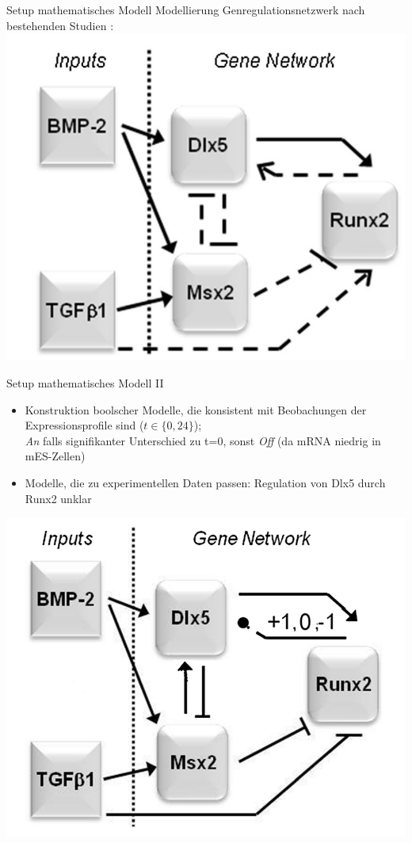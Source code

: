 \documentclass[handout]{beamer}
\begin{document}
\begin{frame}{Setup mathematisches Modell}
Modellierung Genregulationsnetzwerk nach bestehenden Studien
	\pause
	: \includegraphics[scale=0.22]{regulatory_network.jpg}
\end{frame}

\begin{frame}{Setup mathematisches Modell II}
\begin{itemize}
	\item Konstruktion boolscher Modelle, die konsistent mit Beobachungen der Expressionsprofile sind ($t \in \{0,24\}$); 
	\pause
	\\ \emph{An} falls signifikanter Unterschied zu t=0, sonst \emph{Off} (da mRNA niedrig in mES-Zellen)
	\pause
	\item Modelle, die zu experimentellen Daten passen: Regulation von Dlx5 durch Runx2 unklar
\end{itemize}
\end{frame}

\begin{frame}
\includegraphics[scale=0.24]{regulatory_network_results.jpg}
\end{frame}
\end{document}
